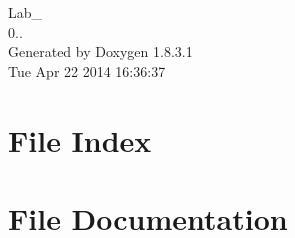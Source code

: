 \documentclass{book}
\begin{document}
\begin{titlepage}
\vspace*{7cm}
\begin{center}
{\Large Lab\-\_ \\[1ex]\large 0.. }\\
\vspace*{1cm}
{\large Generated by Doxygen 1.8.3.1}\\
\vspace*{0.5cm}
{\small Tue Apr 22 2014 16:36:37}\\
\end{center}
\end{titlepage}
\clearemptydoublepage
{}
\tableofcontents
\clearemptydoublepage
{}
\chapter{File Index}

\chapter{File Documentation}

\printindex
\end{document}
